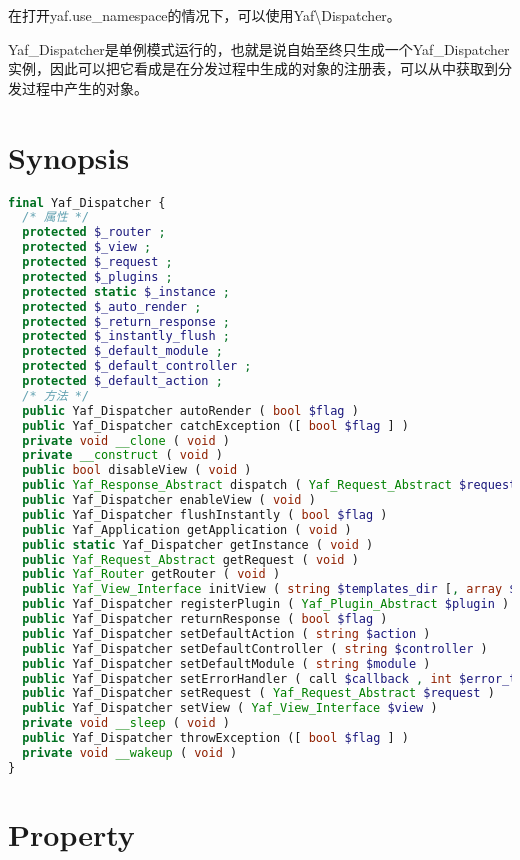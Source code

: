 在打开yaf.use\_namespace的情况下，可以使用Yaf\textbackslash Dispatcher。

Yaf\_Dispatcher是单例模式运行的，也就是说自始至终只生成一个Yaf\_Dispatcher实例，因此可以把它看成是在分发过程中生成的对象的注册表，可以从中获取到分发过程中产生的对象。

\section{Synopsis}


\begin{lstlisting}[language=PHP]
final Yaf_Dispatcher {
  /* 属性 */
  protected $_router ;
  protected $_view ;
  protected $_request ;
  protected $_plugins ;
  protected static $_instance ;
  protected $_auto_render ;
  protected $_return_response ;
  protected $_instantly_flush ;
  protected $_default_module ;
  protected $_default_controller ;
  protected $_default_action ;
  /* 方法 */
  public Yaf_Dispatcher autoRender ( bool $flag )
  public Yaf_Dispatcher catchException ([ bool $flag ] )
  private void __clone ( void )
  private __construct ( void )
  public bool disableView ( void )
  public Yaf_Response_Abstract dispatch ( Yaf_Request_Abstract $request )
  public Yaf_Dispatcher enableView ( void )
  public Yaf_Dispatcher flushInstantly ( bool $flag )
  public Yaf_Application getApplication ( void )
  public static Yaf_Dispatcher getInstance ( void )
  public Yaf_Request_Abstract getRequest ( void )
  public Yaf_Router getRouter ( void )
  public Yaf_View_Interface initView ( string $templates_dir [, array $options ] )
  public Yaf_Dispatcher registerPlugin ( Yaf_Plugin_Abstract $plugin )
  public Yaf_Dispatcher returnResponse ( bool $flag )
  public Yaf_Dispatcher setDefaultAction ( string $action )
  public Yaf_Dispatcher setDefaultController ( string $controller )
  public Yaf_Dispatcher setDefaultModule ( string $module )
  public Yaf_Dispatcher setErrorHandler ( call $callback , int $error_types )
  public Yaf_Dispatcher setRequest ( Yaf_Request_Abstract $request )
  public Yaf_Dispatcher setView ( Yaf_View_Interface $view )
  private void __sleep ( void )
  public Yaf_Dispatcher throwException ([ bool $flag ] )
  private void __wakeup ( void )
}
\end{lstlisting}



\section{Property}





